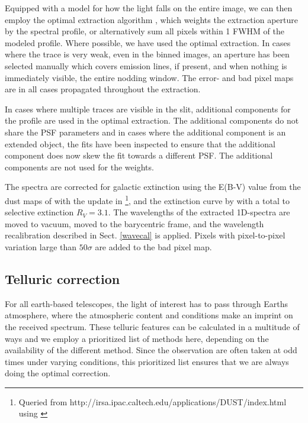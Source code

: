 \documentclass{aa}    %
\begin{document}
Equipped with a model for how the light falls on the entire image, we can then
employ the optimal extraction algorithm \cite{Horne1986}, which weights the
extraction aperture by the spectral profile, or alternatively sum all pixels
within 1 FWHM of the modeled profile. Where possible, we have used the optimal
extraction. In cases where the trace is very weak, even in the binned images, an
aperture has been selected manually which covers emission lines, if present, and
when nothing is immediately visible, the entire nodding window. The error- and
bad pixel maps are in all cases propagated throughout the extraction.

In cases where multiple traces are visible in the slit, additional components
for the profile are used in the optimal extraction. The additional components
do not share the PSF parameters and in cases where the additional component is an
extended object, the fits have been inspected to ensure that the additional
component does now skew the fit towards a different PSF. The additional
components are not used for the weights.

The spectra are corrected for galactic extinction using the E(B-V) value from
the dust maps of \citet{Schlegel1998} with the update in
\citet{Schlafly2011}\footnote{Queried from
	http://irsa.ipac.caltech.edu/applications/DUST/index.html using
	\citet{astroquery}}, and the extinction curve by \cite{Cardelli1989} with a
total to selective extinction $R_V = 3.1$. The wavelengths of the extracted
1D-spectra are moved to vacuum, moved to the barycentric frame, and the
wavelength recalibration described in Sect. \ref{wavecal} is applied. Pixels
with pixel-to-pixel variation large than $50 \sigma$ are added to the bad pixel
map.


\subsection{Telluric correction} \label{tell_corr}

For all earth-based telescopes, the light of interest has to pass through Earths
atmosphere, where the atmospheric content and conditions make an imprint on the
received spectrum. These telluric features can be calculated in a multitude of
ways and we employ a prioritized list of methods here, depending on the
availability of the different method. Since the observation are often taken at
odd times under varying conditions, this prioritized list ensures that we are
always doing the optimal correction.
\end{document}
